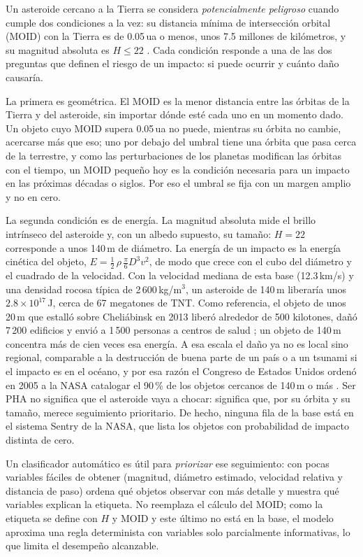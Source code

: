 \documentclass[conference]{IEEEtran}
\begin{document}
Un asteroide cercano a la Tierra se considera \emph{potencialmente peligroso} cuando cumple dos condiciones a la vez: su distancia mínima de intersección orbital (MOID) con la Tierra es de 0.05\,ua o menos, unos 7.5 millones de kilómetros, y su magnitud absoluta es $H\le 22$ \cite{cneos}. Cada condición responde a una de las dos preguntas que definen el riesgo de un impacto: si puede ocurrir y cuánto daño causaría.

La primera es geométrica. El MOID es la menor distancia entre las órbitas de la Tierra y del asteroide, sin importar dónde esté cada uno en un momento dado. Un objeto cuyo MOID supera 0.05\,ua no puede, mientras su órbita no cambie, acercarse más que eso; uno por debajo del umbral tiene una órbita que pasa cerca de la terrestre, y como las perturbaciones de los planetas modifican las órbitas con el tiempo, un MOID pequeño hoy es la condición necesaria para un impacto en las próximas décadas o siglos. Por eso el umbral se fija con un margen amplio y no en cero.

La segunda condición es de energía. La magnitud absoluta mide el brillo intrínseco del asteroide y, con un albedo supuesto, su tamaño: $H=22$ corresponde a unos 140\,m de diámetro. La energía de un impacto es la energía cinética del objeto, $E=\tfrac12\,\rho\,\tfrac{\pi}{6}D^{3}v^{2}$, de modo que crece con el cubo del diámetro y el cuadrado de la velocidad. Con la velocidad mediana de esta base (12.3\,km/s) y una densidad rocosa típica de 2\,600\,kg/m$^3$, un asteroide de 140\,m liberaría unos $2.8\times10^{17}$\,J, cerca de 67 megatones de TNT. Como referencia, el objeto de unos 20\,m que estalló sobre Cheliábinsk en 2013 liberó alrededor de 500 kilotones, dañó 7\,200 edificios y envió a 1\,500 personas a centros de salud \cite{chelyabinsk}; un objeto de 140\,m concentra más de cien veces esa energía. A esa escala el daño ya no es local sino regional, comparable a la destrucción de buena parte de un país o a un tsunami si el impacto es en el océano, y por esa razón el Congreso de Estados Unidos ordenó en 2005 a la NASA catalogar el 90\,\% de los objetos cercanos de 140\,m o más \cite{nasem2019,nrc2010}. Ser PHA no significa que el asteroide vaya a chocar: significa que, por su órbita y su tamaño, merece seguimiento prioritario. De hecho, ninguna fila de la base está en el sistema Sentry de la NASA, que lista los objetos con probabilidad de impacto distinta de cero.

Un clasificador automático es útil para \emph{priorizar} ese seguimiento: con pocas variables fáciles de obtener (magnitud, diámetro estimado, velocidad relativa y distancia de paso) ordena qué objetos observar con más detalle y muestra qué variables explican la etiqueta. No reemplaza el cálculo del MOID; como la etiqueta se define con $H$ y MOID y este último no está en la base, el modelo aproxima una regla determinista con variables solo parcialmente informativas, lo que limita el desempeño alcanzable.
\end{document}
